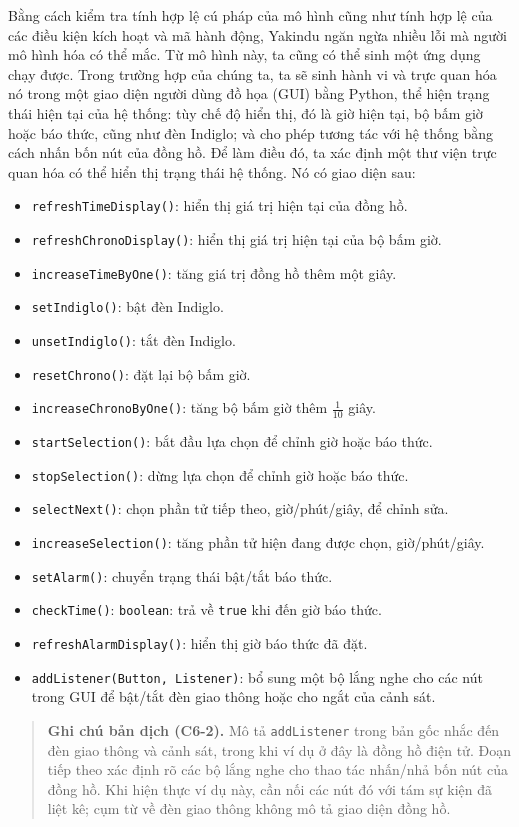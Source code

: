 Bằng cách kiểm tra tính hợp lệ cú pháp của mô hình cũng như tính hợp lệ của các điều kiện kích hoạt và mã hành động, Yakindu ngăn ngừa nhiều lỗi mà người mô hình hóa có thể mắc. Từ mô hình này, ta cũng có thể sinh một ứng dụng chạy được. Trong trường hợp của chúng ta, ta sẽ sinh hành vi và trực quan hóa nó trong một giao diện người dùng đồ họa (GUI) bằng Python, thể hiện trạng thái hiện tại của hệ thống: tùy chế độ hiển thị, đó là giờ hiện tại, bộ bấm giờ hoặc báo thức, cũng như đèn Indiglo; và cho phép tương tác với hệ thống bằng cách nhấn bốn nút của đồng hồ. Để làm điều đó, ta xác định một thư viện trực quan hóa có thể hiển thị trạng thái hệ thống. Nó có giao diện sau:
\begin{itemize}
\item \texttt{refreshTimeDisplay()}: hiển thị giá trị hiện tại của đồng hồ.
\item \texttt{refreshChronoDisplay()}: hiển thị giá trị hiện tại của bộ bấm giờ.
\item \texttt{increaseTimeByOne()}: tăng giá trị đồng hồ thêm một giây.
\item \texttt{setIndiglo()}: bật đèn Indiglo.
\item \texttt{unsetIndiglo()}: tắt đèn Indiglo.
\item \texttt{resetChrono()}: đặt lại bộ bấm giờ.
\item \texttt{increaseChronoByOne()}: tăng bộ bấm giờ thêm $\frac{1}{10}$ giây.
\item \texttt{startSelection()}: bắt đầu lựa chọn để chỉnh giờ hoặc báo thức.
\item \texttt{stopSelection()}: dừng lựa chọn để chỉnh giờ hoặc báo thức.
\item \texttt{selectNext()}: chọn phần tử tiếp theo, giờ/phút/giây, để chỉnh sửa.
\item \texttt{increaseSelection()}: tăng phần tử hiện đang được chọn, giờ/phút/giây.
\item \texttt{setAlarm()}: chuyển trạng thái bật/tắt báo thức.
\item \texttt{checkTime()}: \texttt{boolean}: trả về \texttt{true} khi đến giờ báo thức.
\item \texttt{refreshAlarmDisplay()}: hiển thị giờ báo thức đã đặt.
\item \texttt{addListener(Button, Listener)}: bổ sung một bộ lắng nghe cho các nút trong GUI để bật/tắt đèn giao thông hoặc cho ngắt của cảnh sát.
\end{itemize}

\begin{quote}
\small\textbf{Ghi chú bản dịch (C6-2).} Mô tả \texttt{addListener} trong bản gốc nhắc đến đèn giao thông và cảnh sát, trong khi ví dụ ở đây là đồng hồ điện tử. Đoạn tiếp theo xác định rõ các bộ lắng nghe cho thao tác nhấn/nhả bốn nút của đồng hồ. Khi hiện thực ví dụ này, cần nối các nút đó với tám sự kiện đã liệt kê; cụm từ về đèn giao thông không mô tả giao diện đồng hồ.
\end{quote}

